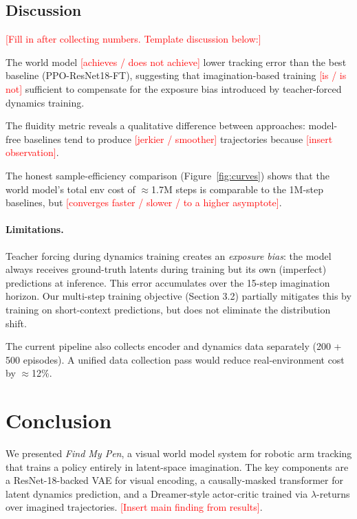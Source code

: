 \documentclass{article}
\newcommand{\TODO}[1]{\textcolor{red}{[#1]}}
\begin{document}
\subsection{Discussion}

\TODO{Fill in after collecting numbers. Template discussion below:}

The world model \TODO{achieves / does not achieve} lower tracking error than the best
baseline (PPO-ResNet18-FT), suggesting that imagination-based training \TODO{is / is not}
sufficient to compensate for the exposure bias introduced by teacher-forced dynamics training.

The fluidity metric reveals a qualitative difference between approaches: model-free baselines
tend to produce \TODO{jerkier / smoother} trajectories because \TODO{insert observation}.

The honest sample-efficiency comparison (Figure~\ref{fig:curves}) shows that the world model's
total env cost of $\approx$1.7M steps is comparable to the 1M-step baselines, but
\TODO{converges faster / slower / to a higher asymptote}.

\paragraph{Limitations.}
Teacher forcing during dynamics training creates an \emph{exposure bias}: the model always
receives ground-truth latents during training but its own (imperfect) predictions at inference.
This error accumulates over the 15-step imagination horizon.
Our multi-step training objective (Section 3.2) partially mitigates this by training on
short-context predictions, but does not eliminate the distribution shift.

The current pipeline also collects encoder and dynamics data separately (200 + 500 episodes).
A unified data collection pass would reduce real-environment cost by $\approx$12\%.


\section{Conclusion}

We presented \emph{Find My Pen}, a visual world model system for robotic arm tracking
that trains a policy entirely in latent-space imagination.
The key components are a ResNet-18-backed VAE for visual encoding, a causally-masked
transformer for latent dynamics prediction, and a Dreamer-style actor-critic trained via
$\lambda$-returns over imagined trajectories.
\TODO{Insert main finding from results}.
\end{document}
